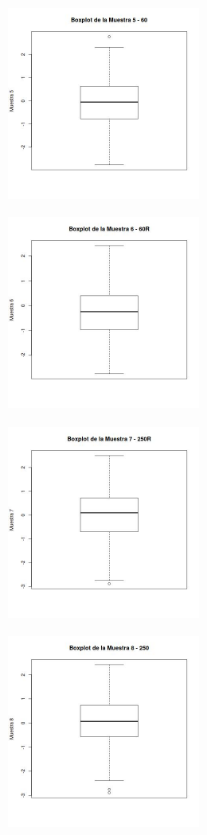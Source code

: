 \documentclass[a4paper,10pt,twocolumn]{report}
\begin{document}
	\begin{figure}[H]
		\centering
		\includegraphics[width=0.45\textwidth]{img/ex2/BoxPlots/BoxPlots5.jpeg}
		\label{box:2.5}
	\end{figure}

	\begin{figure}[H]
		\centering
		\includegraphics[width=0.45\textwidth]{img/ex2/BoxPlots/BoxPlots6.jpeg}
		\label{box:2.6}
	\end{figure}

	\begin{figure}[H]
		\centering
		\includegraphics[width=0.45\textwidth]{img/ex2/BoxPlots/BoxPlots7.jpeg}
		\label{box:2.7}
	\end{figure}

	\begin{figure}[H]
		\centering
		\includegraphics[width=0.45\textwidth]{img/ex2/BoxPlots/BoxPlots8.jpeg}
		\label{box:2.8}
	\end{figure}
\end{document}
